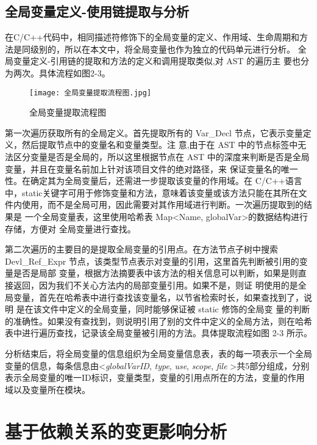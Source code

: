 \clearpage


\subsection{全局变量定义-使用链提取与分析}
在C/C++代码中，相同描述符修饰下的全局变量的定义、作用域、生命周期和方法是同级别的，所以在本文中，将全局变量也作为独立的代码单元进行分析。
全局变量定义-引用链的提取和方法的定义和调用提取类似,对 AST 的遍历主
要也分为两次。具体流程如图2-3。

\begin{figure}[h]
\centering
\texttt{[image: 全局变量提取流程图.jpg]}
\caption{全局变量提取流程图}
\end{figure}

第一次遍历获取所有的全局定义。首先提取所有的
Var\_Decl 节点，它表示变量定义，然后提取节点中的变量名和变量类型。注
意,由于在 AST 中的节点标签中无法区分变量是否是全局的，所以这里根据节点在 AST
中的深度来判断是否是全局变量，并且在变量名前加上针对该项目文件的绝对路径，来
保证变量名的唯一性。在确定其为全局变量后，还需进一步提取该变量的作用域。在
C/C++语言中，static关键字可用于修饰变量和方法，意味着该变量或该方法只能在其所在文
件内使用，而不是全局可用，因此需要对其作用域进行判断。一次遍历提取到的结果是
一个全局变量表，这里使用哈希表 Map<Name, globalVar>的数据结构进行存储，方便对
全局变量进行查找。

第二次遍历的主要目的是提取全局变量的引用点。在方法节点子树中搜索
Devl\_Ref\_Expr 节点，该类型节点表示对变量的引用，这里首先判断被引用的变量是否是局部
变量，根据方法摘要表中该方法的相关信息可以判断，如果是则直接返回，因为我们不关心方法内的局部变量引用。如果不是，则证
明使用的是全局变量，首先在哈希表中进行查找该变量名，以节省检索时长，如果查找到了，说明
是在该文件中定义的全局变量，同时能够保证被 static 修饰的全局变
量的判断的准确性。如果没有查找到，则说明引用了别的文件中定义的全局方法，则在哈希
表中进行遍历查找，记录该全局变量被引用的方法。具体提取流程如图 2-3 所示。

分析结束后，将全局变量的信息组织为全局变量信息表，表的每一项表示一个全局变量的信息，每条信息由\textless \textit{globalVarID}, \textit{type}, \textit{use}, \textit{scope}, \textit{file}  \textgreater 共5部分组成，分别表示全局变量的唯一ID标识，变量类型，变量的引用点所在的方法，变量的作用域以及变量所在模块。



\section{基于依赖关系的变更影响分析}

